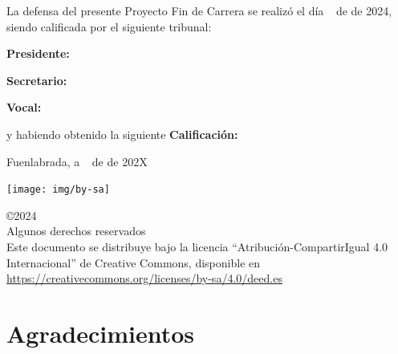\documentclass[a4paper, 12pt]{book}
\makeatletter
\let\theauthor\@author
\makeatother
\begin{document}
\vspace{0.8cm}
La defensa del presente Proyecto Fin de Carrera se realizó el día \qquad$\;\,$ de \qquad\qquad\qquad\qquad \newline de 2024, siendo calificada por el siguiente tribunal:


\vspace{0.5cm}
\textbf{Presidente:}

\vspace{1cm}
\textbf{Secretario:}

\vspace{1cm}
\textbf{Vocal:}


\vspace{1cm}
y habiendo obtenido la siguiente \textbf{Calificación:}


\vspace{1cm}
\begin{flushright}
Fuenlabrada, a \qquad$\;\,$ de \qquad\qquad\qquad\qquad de 202X
\end{flushright}

\vspace{1cm}

\texttt{[image: img/by-sa]}

\noindent©2024 \theauthor  \\
Algunos derechos reservados  \\
Este documento se distribuye bajo la licencia ``Atribución-CompartirIgual 4.0 Internacional'' de Creative Commons, disponible en \\
\url{https://creativecommons.org/licenses/by-sa/4.0/deed.es}





\chapter*{Agradecimientos}
\end{document}
